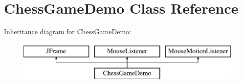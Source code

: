\hypertarget{class_chess_game_demo}{\section{Chess\-Game\-Demo Class Reference}
\label{class_chess_game_demo}
}
Inheritance diagram for Chess\-Game\-Demo\-:\begin{figure}[H]
\begin{center}
\leavevmode
\includegraphics[height=2.000000cm]{class_chess_game_demo}
\end{center}
\end{figure}
